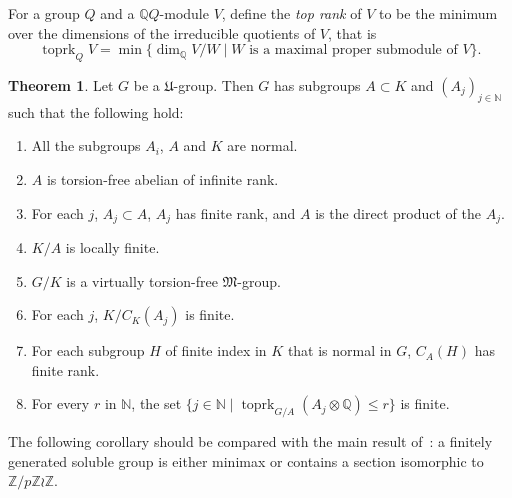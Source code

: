 \documentclass[11pt]{article}
\theoremstyle{definition}
\numberwithin{equation}{section}
\numberwithin{figure}{section}
\numberwithin{table}{section}
\newtheorem{theor}{Theorem}
\newcommand{\Q}{\mathbb{Q}}
\newcommand{\Z}{\mathbb{Z}}
\newcommand{\N}{\mathbb{N}}
\DeclareMathOperator{\toprk}{toprk}
\newcommand*{\romanenumi}{\renewcommand*{\theenumi}{\roman{enumi}}}
\begin{document}

For a group $Q$ and a $\Q Q$-module $V$, define the \emph{top rank} of $V$ to be the minimum over the dimensions of the irreducible quotients of $V$, that is
\[
\toprk_Q V = \min \{ \dim_\Q V/W \mid W \text{ is a maximal proper submodule of } V\}.
\]

\setcounter{theor}{1}
\begin{theor}\label{main}
Let $G$ be a $\mathfrak U$-group. Then $G$ has subgroups $A\subset K$ and $(A_j)_{j\in\N}$ such that the following hold:
\begin{enumerate}\romanenumi
\item \label{list3.1.1} All the subgroups $A_i$, $A$ and $K$ are normal.
\item \label{list3.1.2}$A$ is torsion-free abelian of infinite rank.
\item \label{list3.1.3}For each $j$, $A_j\subset A$, $A_j$ has finite rank, and $A$ is the direct product of the $A_j$.
\item \label{list3.1.4}$K/A$ is locally finite.
\item \label{list3.1.5}$G/K$ is a virtually torsion-free $\mathfrak M$-group.
\item \label{list3.1.6}For each $j$, $K/C_K(A_j)$ is finite.
\item \label{list3.1.7}For each subgroup $H$ of finite index in $K$ that is normal in $G$, $C_A(H)$ has finite rank.
\item \label{list3.1.8}For every $r$ in $\N$, the set $\{ j \in \N \mid \toprk_{G/A} (A_j\otimes \Q) \leq r \}$ is finite.
\end{enumerate}
\end{theor}

The following corollary should be compared with the main result of~\cite{K84}: a finitely generated soluble group is either minimax or contains a section isomorphic to $\Z/p\Z\wr \Z$.
\end{document}

